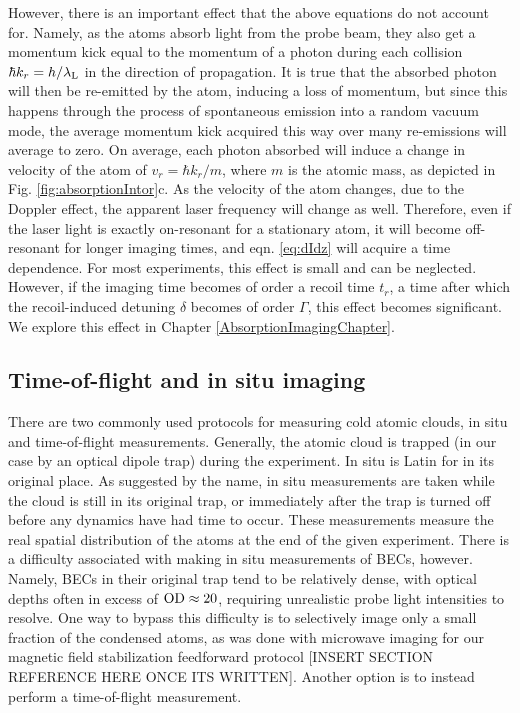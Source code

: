 However, there is an important effect that the above equations do not account for. Namely, as the atoms absorb light from the probe beam, they also get a momentum kick equal to the momentum of a photon during each collision $\hbar k_r=h/\lambda_{\rm L}$ in the direction of propagation. It is true that the absorbed photon will then be re-emitted by the atom, inducing a loss of momentum, but since this happens through the process of spontaneous emission into a random vacuum mode, the average momentum kick acquired this way over many re-emissions will average to zero. On average, each photon absorbed will induce a change in velocity of the atom of $v_r=\hbar k_r/m$, where $m$ is the atomic mass, as depicted in Fig. \ref{fig:absorptionIntor}c. As the velocity of the atom changes, due to the Doppler effect, the apparent laser frequency will change as well. Therefore, even if the laser light is exactly on-resonant for a stationary atom, it will become off-resonant for longer imaging times, and eqn. \ref{eq:dIdz} will acquire a time dependence. For most experiments, this effect is small and can be neglected. However, if the imaging time becomes of order a recoil time $t_r$, a time after which the recoil-induced detuning $\delta$ becomes of order $\Gamma$, this effect becomes significant. We explore this effect in Chapter \ref{AbsorptionImagingChapter}.  

\subsection{Time-of-flight and in situ imaging}\label{sec:timeOfFlight}
There are two commonly used protocols for measuring cold atomic clouds, in situ and time-of-flight measurements. Generally, the atomic cloud is trapped (in our case by an optical dipole trap) during the experiment. In situ is Latin for in its original place. As suggested by the name, in situ measurements are taken while the cloud is still in its original trap, or immediately after the trap is turned off before any dynamics have had time to occur. These measurements measure the real spatial distribution of the atoms at the end of the given experiment. There is a difficulty associated with making in situ measurements of BECs, however. Namely, BECs in their original trap tend to be relatively dense, with optical depths often in excess of ${\rm OD}\approx20$, requiring unrealistic probe light intensities to resolve. One way to bypass this difficulty is to selectively image only a small fraction of the condensed atoms, as was done with microwave imaging for our magnetic field stabilization feedforward protocol [INSERT SECTION REFERENCE HERE ONCE ITS WRITTEN]. Another option is to instead perform a time-of-flight measurement.

